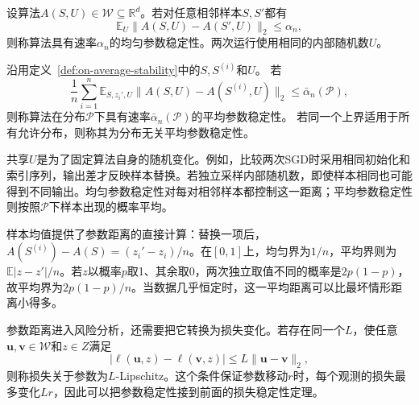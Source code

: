 \begin{definition}[均匀参数稳定性]
\label{def:uniform-parameter-stability}
设算法$A(S,U)\in\mathcal W\subseteq\mathbb R^d$。若对任意相邻样本$S,S'$都有
\[
 \mathbb E_U\|A(S,U)-A(S',U)\|_2\leq\alpha_n,
\]
则称算法具有速率$\alpha_n$的均匀参数稳定性。两次运行使用相同的内部随机数$U$。
\end{definition}

\begin{definition}[平均参数稳定性]
\label{def:average-parameter-stability}
沿用定义~\ref{def:on-average-stability}中的$S,S^{(i)}$和$U$。
若
\begin{equation}
 \frac1n\sum_{i=1}^n\mathbb E_{S,z_i',U}
 \|A(S,U)-A(S^{(i)},U)\|_2\leq\bar\alpha_n(\mathcal P),
 \label{eq:average-parameter-stability}
\end{equation}
则称算法在分布$\mathcal P$下具有速率$\bar\alpha_n(\mathcal P)$的平均参数稳定性。
若同一个上界适用于所有允许分布，则称其为分布无关平均参数稳定性。
\end{definition}

共享$U$是为了固定算法自身的随机变化。例如，比较两次SGD时采用相同初始化和索引序列，输出差才反映样本替换。若独立采样内部随机数，即使样本相同也可能得到不同输出。均匀参数稳定性对每对相邻样本都控制这一距离；平均参数稳定性则按照$\mathcal P$下样本出现的概率平均。

样本均值提供了参数距离的直接计算：替换一项后，$A(S^{(i)})-A(S)=(z_i'-z_i)/n$。在$[0,1]$上，均匀界为$1/n$，平均界则为$\mathbb E|z-z'|/n$。若$z$以概率$p$取1、其余取0，两次独立取值不同的概率是$2p(1-p)$，故平均界为$2p(1-p)/n$。当数据几乎恒定时，这一平均距离可以比最坏情形距离小得多。

参数距离进入风险分析，还需要把它转换为损失变化。若存在同一个$L$，使任意$\bm u,\bm v\in\mathcal W$和$z\in Z$满足
\begin{equation}
 |\ell(\bm u,z)-\ell(\bm v,z)|\leq L\|\bm u-\bm v\|_2,
 \label{eq:parameter-loss-lipschitz}
\end{equation}
则称损失关于参数为$L$-Lipschitz。这个条件保证参数移动$r$时，每个观测的损失最多变化$Lr$，因此可以把参数稳定性接到前面的损失稳定性定理。

